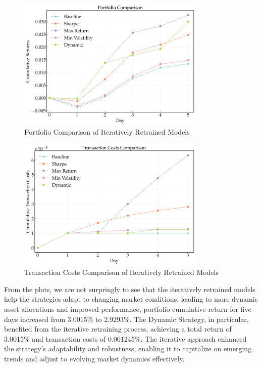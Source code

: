 \begin{figure}[htbp]
    \centering
    \includegraphics[width=0.8\textwidth]{figures/portfolio_comparison_final.png}
    \caption{Portfolio Comparison of Iteratively Retrained Models}
    \label{fig:portfolio_comparison_iterative}
\end{figure}


\begin{figure}[htbp]
    \centering
    \includegraphics[width=0.8\textwidth]{figures/trx_costs_comparison_final.png}
    \caption{Transaction Costs Comparison of Iteratively Retrained Models}
    \label{fig:trx_costs_comparison_iterative}
\end{figure}

From the plots, we are not surpringly to see that the iteratively retrained models help the strategies adapt to changing market conditions, leading to more dynamic asset allocations and improved performance, portfolio cumulative return for five days increased from 3.0015\% to 2.9293\%. 
The Dynamic Strategy, in particular, benefited from the iterative retraining process, achieving a total return of 3.0015\% and transaction costs of 0.001245\%. The iterative approach enhanced the strategy's adaptability and robustness, enabling it to capitalize on emerging trends and adjust to evolving market dynamics effectively.

